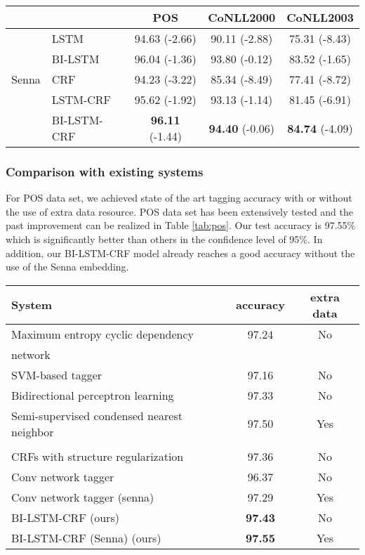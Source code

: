 \documentclass[11pt,a4paper]{article}
\begin{document}
\begin{table*}[!hbt]
\begin{center} 
\caption{Tagging performance on POS, chunking and NER tasks with only word features.}
\label{tab:results2}
\begin{tabular}{l|l|c|c|c}
\hline
& &  POS & CoNLL2000 & CoNLL2003 \\ \hline
& LSTM & 94.63 (-2.66) & 90.11 (-2.88) &  75.31 (-8.43)\\
& BI-LSTM & 96.04 (-1.36) & 93.80 (-0.12) &  83.52 (-1.65)\\
Senna & CRF &  94.23 (-3.22) & 85.34 (-8.49) &  77.41 (-8.72)\\ 
 & LSTM-CRF & 95.62 (-1.92) & 93.13 (-1.14) &  81.45 (-6.91)\\
& BI-LSTM-CRF & \textbf{96.11} (-1.44)& \textbf{94.40} (-0.06) & \textbf{84.74} (-4.09) \\ \hline
\end{tabular}
\end{center}
\end{table*}

\subsubsection{Comparison with existing systems}
For POS data set, we achieved state of the art tagging accuracy with or without the use of extra data resource. POS data set has been extensively tested and the past improvement can be realized in Table \ref{tab:pos}. Our test accuracy is 97.55\% which is significantly better than others in the confidence level of 95\%. In addition, our BI-LSTM-CRF model already reaches a good accuracy without the use of the Senna embedding. 

\begin{table*}[!hbt]
\begin{center} 
\caption{Comparison of tagging accuracy of different models for POS.}
\label{tab:pos}
\begin{tabular}{l|c|c}
\hline
System & accuracy & extra data \\ \hline
Maximum entropy cyclic dependency  & 97.24 & No \\
network \cite{toutanova1} & &  \\ 
SVM-based tagger \cite{gimenez1} & 97.16 & No \\ 
Bidirectional perceptron learning \cite{shen1} & 97.33 & No \\ 
Semi-supervised condensed nearest neighbor & 97.50 & Yes \\ 
\cite{soegaard1} & & \\ 
CRFs with structure regularization \cite{sun1} & 97.36 & No \\  
Conv network tagger \cite{collobert1} & 96.37 & No \\ 
Conv network tagger (senna) \cite{collobert1} & 97.29 & Yes \\ \hline
BI-LSTM-CRF (ours) & \textbf{97.43} & No  \\
BI-LSTM-CRF (Senna) (ours) &  \textbf{97.55} & Yes \\ \hline
\end{tabular}
\end{center}
\end{table*}
\end{document}

